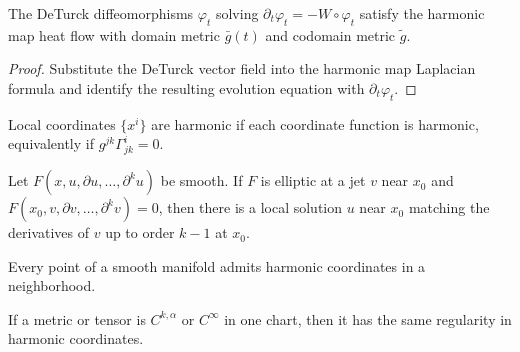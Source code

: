 \begin{lemma}
\label{ch03-lem-deTurck-diffeomorphisms-harmonic-map}

The DeTurck diffeomorphisms \(\varphi_t\) solving \(\partial_t\varphi_t=-W\circ\varphi_t\) satisfy the harmonic map heat flow with domain metric \(\bar g(t)\) and codomain metric \(\tilde g\).
\end{lemma}

\begin{proof}
\sketch Substitute the DeTurck vector field into the harmonic map Laplacian formula and identify the resulting evolution equation with \(\partial_t\varphi_t\).
\end{proof}

\begin{definition}
\label{ch03-def-harmonic-coordinates}

Local coordinates \(\{x^i\}\) are harmonic if each coordinate function is harmonic, equivalently if \(g^{jk}\Gamma^i_{jk}=0\).
\end{definition}

\begin{theorem}
\label{ch03-thm-local-elliptic-solvability}

Let \(F(x,u,\partial u,\ldots,\partial^ku)\) be smooth. If \(F\) is elliptic at a jet \(v\) near \(x_0\) and \(F(x_0,v,\partial v,\ldots,\partial^kv)=0\), then there is a local solution \(u\) near \(x_0\) matching the derivatives of \(v\) up to order \(k-1\) at \(x_0\).
\end{theorem}

\begin{corollary}
\label{ch03-cor-harmonic-coordinates-exist}

Every point of a smooth manifold admits harmonic coordinates in a neighborhood.
\end{corollary}

\begin{lemma}
\label{ch03-lem-harmonic-coordinate-regularity}

If a metric or tensor is \(C^{k,\alpha}\) or \(C^\infty\) in one chart, then it has the same regularity in harmonic coordinates.
\end{lemma}

